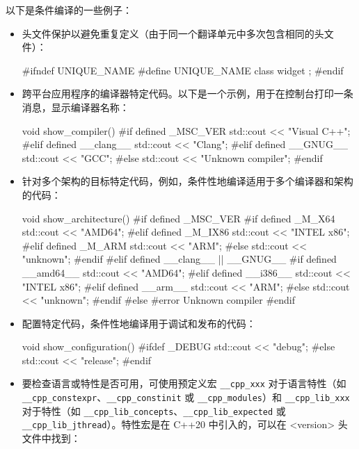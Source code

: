 以下是条件编译的一些例子：

\begin{itemize}
\item
头文件保护以避免重复定义（由于同一个翻译单元中多次包含相同的头文件）：

\begin{cpp}
#ifndef UNIQUE_NAME
#define UNIQUE_NAME
class widget { };
#endif
\end{cpp}

\item
跨平台应用程序的编译器特定代码。以下是一个示例，用于在控制台打印一条消息，显示编译器名称：

\begin{cpp}
void show_compiler()
{
#if defined _MSC_VER
    std::cout << "Visual C++\n";
#elif defined __clang__
    std::cout << "Clang\n";
#elif defined __GNUG__
    std::cout << "GCC\n";
#else
    std::cout << "Unknown compiler\n";
#endif
}
\end{cpp}

\item
针对多个架构的目标特定代码，例如，条件性地编译适用于多个编译器和架构的代码：

\begin{cpp}
void show_architecture()
{
#if defined _MSC_VER
#if defined _M_X64
    std::cout << "AMD64\n";
#elif defined _M_IX86
    std::cout << "INTEL x86\n";
#elif defined _M_ARM
    std::cout << "ARM\n";
#else
    std::cout << "unknown\n";
#endif
#elif defined __clang__ || __GNUG__
#if defined __amd64__
    std::cout << "AMD64\n";
#elif defined __i386__
    std::cout << "INTEL x86\n";
#elif defined __arm__
    std::cout << "ARM\n";
#else
    std::cout << "unknown\n";
#endif
#else
#error Unknown compiler
#endif
}
\end{cpp}

\item
配置特定代码，条件性地编译用于调试和发布的代码：

\begin{cpp}
void show_configuration()
{
#ifdef _DEBUG
    std::cout << "debug\n";
#else
    std::cout << "release\n";
#endif
}
\end{cpp}

\item
要检查语言或特性是否可用，可使用预定义宏 \verb|__cpp_xxx| 对于语言特性（如 \verb|__cpp_constexpr|、\verb|__cpp_constinit| 或 \verb|__cpp_modules|）和 \verb|__cpp_lib_xxx| 对于特性（如 \verb|__cpp_lib_concepts|、\verb|__cpp_lib_expected| 或 \verb|__cpp_lib_jthread|）。特性宏是在 C++20 中引入的，可以在 <version> 头文件中找到：


\end{itemize}
